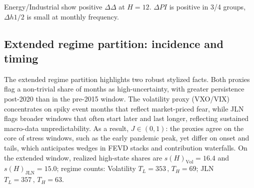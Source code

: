\documentclass[
  11pt,
]{article}
\begin{document}
\begin{table}[!h]
\centering
\caption[Proxy wedges by group]{\label{tab:tbl2render}\label{tab:tblX} Proxy wedges by commodity group: $\Delta\Delta$-GFEVD (Volatility $-$ JLN) at $H=12$ and $H=24$, and $\Delta$ half-life in months (Volatility $H$ $-$ JLN $H$).}
\centering
{}
\end{table}

Energy/Industrial show positive \(\Delta\Delta\) at \(H=12\). \(\Delta PI\) is positive in 3/4 groups, \(\Delta h{1/2}\) is small at monthly frequency.

\subsection{Extended regime partition: incidence and timing}\label{sec:extensionthree}

The extended regime partition highlights two robust stylized facts. Both proxies flag a non-trivial share of months as high-uncertainty, with greater persistence post-2020 than in the pre-2015 window. The volatility proxy (VXO/VIX) concentrates on spiky event months that reflect market-priced fear, while JLN flags broader windows that often start later and last longer, reflecting sustained macro-data unpredictability. As a result, \(J\in(0,1)\): the proxies agree on the core of stress windows, such as the early pandemic peak, yet differ on onset and tails, which anticipates wedges in FEVD stacks and contribution waterfalls.
On the extended window, realized high-state shares are \(s(H)_{\text{Vol}}=16.4%
\) and \(s(H)_{\text{JLN}}=15.0%
\); regime counts: Volatility \(T_L=353\, ,\, T_H=69\); JLN \(T_L=357\, ,\, T_H=63\).
\end{document}
